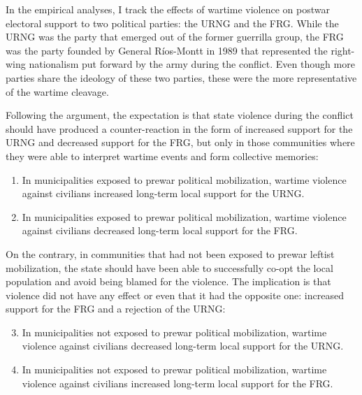 \documentclass[12pt, notitlepage]{article}
\begin{document}
In the empirical analyses, I track the effects of wartime violence on postwar electoral support to two political parties: the URNG and the FRG.
While the URNG was the party that emerged out of the former guerrilla group, the FRG was the party founded by General Ríos-Montt in 1989 that represented the right-wing nationalism put forward by the army during the conflict.
Even though more parties share the ideology of these two parties, these were the more representative of the wartime cleavage.

Following the argument, the expectation is that state violence during the conflict should have produced a counter-reaction in the form of increased support for the URNG and decreased support for the FRG, but only in those communities where they were able to interpret wartime events and form collective memories:

\begin{enumerate}[label={\bf H\arabic*:} , ref=H\arabic* , wide=0.5em, leftmargin=*]
  \item \label{h:URNG-mob} In municipalities exposed to prewar political mobilization, wartime violence against civilians increased long-term local support for the URNG.
  \item \label{h:FRG-mob} In municipalities exposed to prewar political mobilization, wartime violence against civilians decreased long-term local support for the FRG.
\end{enumerate}

On the contrary, in communities that had not been exposed to prewar leftist mobilization, the state should have been able to successfully co-opt the local population and avoid being blamed for the violence.
The implication is that violence did not have any effect or even that it had the opposite one: increased support for the FRG and a rejection of the URNG:

\begin{enumerate}[label={\bf H\arabic*:} , ref=H\arabic* , wide=0.5em, leftmargin=*]
  \setcounter{enumi}{2}
  \item \label{h:URNG-no-mob} In municipalities not exposed to prewar political mobilization, wartime violence against civilians decreased long-term local support for the URNG.
  \item \label{h:FRG-no-mob} In municipalities not exposed to prewar political mobilization, wartime violence against civilians increased long-term local support for the FRG.
\end{enumerate}
\end{document}
